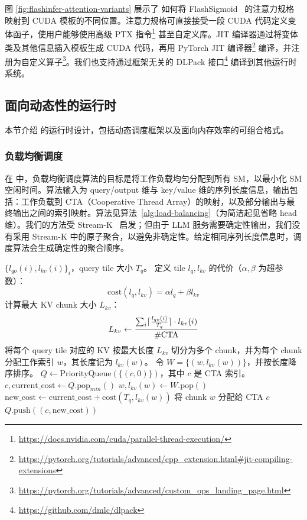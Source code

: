 图 \ref{fig:flashinfer-attention-variants} 展示了 \sys 如何将 FlashSigmoid~\cite{jason2024flashsigmoid} 的注意力规格映射到 CUDA 模板的不同位置。注意力规格可直接接受一段 CUDA 代码定义变体函子，使用户能够使用高级 PTX 指令\footnote{\url{https://docs.nvidia.com/cuda/parallel-thread-execution/}} 甚至自定义库。JIT 编译器通过将变体类及其他信息插入模板生成 CUDA 代码，再用 PyTorch JIT 编译器\footnote{\url{https://pytorch.org/tutorials/advanced/cpp_extension.html\#jit-compiling-extensions}} 编译，并注册为自定义算子\footnote{\url{https://pytorch.org/tutorials/advanced/custom_ops_landing_page.html}}。我们也支持通过框架无关的 DLPack 接口\footnote{\url{https://github.com/dmlc/dlpack}} 编译到其他运行时系统。

\subsection{面向动态性的运行时}

本节介绍 \sys 的运行时设计，包括动态调度框架以及面向内存效率的可组合格式。

\subsubsection{负载均衡调度}

\label{sec:load-balanced-scheduling}

在 \sys 中，负载均衡调度算法的目标是将工作负载均匀分配到所有 SM，以最小化 SM 空闲时间。算法输入为 query/output 维与 key/value 维的序列长度信息，输出包括：工作负载到 CTA（Cooperative Thread Array）的映射，以及部分输出与最终输出之间的索引映射。算法见算法~\ref{alg:load-balancing}（为简洁起见省略 head 维）。我们的方法受 Stream-K~\cite{osama2023streamk} 启发；但由于 LLM 服务需要确定性输出，我们没有采用 Stream-K 中的原子聚合，以避免非确定性。给定相同序列长度信息时，调度算法会生成确定性的聚合顺序。
\begin{algorithm}[tb]
   \scriptsize
   \caption{\sys 的负载均衡调度算法}
   \label{alg:load-balancing}
\begin{algorithmic}[1]
    $\{l_{qo}(i), l_{kv}(i)\}_i$，query tile 大小 $T_q$。
   \STATE 定义 tile $l_q, l_{kv}$ 的代价（$\alpha, \beta$ 为超参数）：
   $$\textrm{cost}(l_q, l_{kv}) = \alpha l_q + \beta l_{kv} $$
   \STATE 计算最大 KV chunk 大小 $L_{kv}$：
   \vspace{-1em}
   $$L_{kv} \leftarrow \frac{\sum_{i}\lceil\frac{l_{qo}(i)}{T_q}\rceil\cdot l_{kv}(i)}{\#\textrm{CTA}}$$
   \STATE 将每个 query tile 对应的 KV 按最大长度 $L_{kv}$ 切分为多个 chunk，并为每个 chunk 分配工作索引 $w$，其长度记为 $l_{kv}(w)$。
   \STATE 令 $W = \{(w, l_{kv}(w))\}$，并按长度降序排序。
   \STATE $Q \leftarrow \textrm{PriorityQueue}(\{(c, 0)\})$，其中 $c$ 是 CTA 索引。
      \STATE $c, \textrm{current\_cost} \leftarrow Q.\textrm{pop}_{min}()$
      \STATE $w, l_{kv}(w) \leftarrow W.\textrm{pop}()$
      \STATE $\textrm{new\_cost} \leftarrow \textrm{current\_cost} + \textrm{cost}(T_q, l_{kv}(w))$
      \STATE 将 chunk $w$ 分配给 CTA $c$
      \STATE $Q.\textrm{push}((c, \textrm{new\_cost}))$
   \ENDWHILE
\end{algorithmic}
   \normalsize
\end{algorithm}

